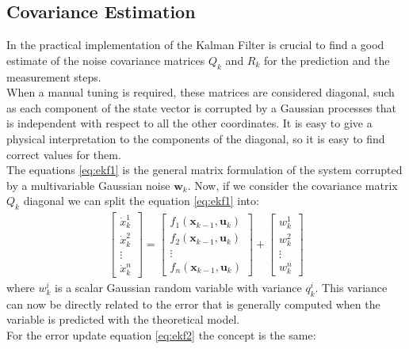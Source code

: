 \subsection{Covariance Estimation}
In the practical implementation of the Kalman Filter is crucial to find a good estimate of the noise covariance matrices $Q_k$ and $R_k$ for the prediction and the measurement steps. \\
When a manual tuning is required, these matrices are considered diagonal, such as each component of the state vector is corrupted by a Gaussian processes that is independent with respect to all the other coordinates. It is easy to give a physical interpretation to the components of the diagonal, so it is easy to find correct values for them.\\
The equations \ref{eq:ekf1} is the general matrix formulation of the system corrupted by a multivariable Gaussian noise $\boldsymbol{w}_k$. Now, if we consider the covariance matrix $Q_k$ diagonal we can split the equation  \ref{eq:ekf1} into:
\begin{align}
{\begin{bmatrix}
\dot{x}_k^1 \\[10pt]
\dot{x}_k^2 \\[10pt]
\vdots \\[10pt]
\dot{x}_k^n
\end{bmatrix}}=
{\begin{bmatrix}
 f_1(\boldsymbol{x}_{k-1},\boldsymbol{u}_k) \\[10pt]
f_2(\boldsymbol{x}_{k-1},\boldsymbol{u}_k)  \\[10pt]
\vdots \\[10pt]
f_n(\boldsymbol{x}_{k-1},\boldsymbol{u}_k) 
\end{bmatrix}} 
+ 
{\begin{bmatrix}
w_k^1 \\[10pt]
w_k^2 \\[10pt]
\vdots \\[10pt]
w_k^n
\end{bmatrix}}
\end{align}
where $w_k^i$ is a scalar Gaussian random variable with variance $q_k^i$. This variance can now be directly related to the error that is generally computed when the variable is predicted with the theoretical model.\\
For the error update equation \ref{eq:ekf2} the concept is the same: 
